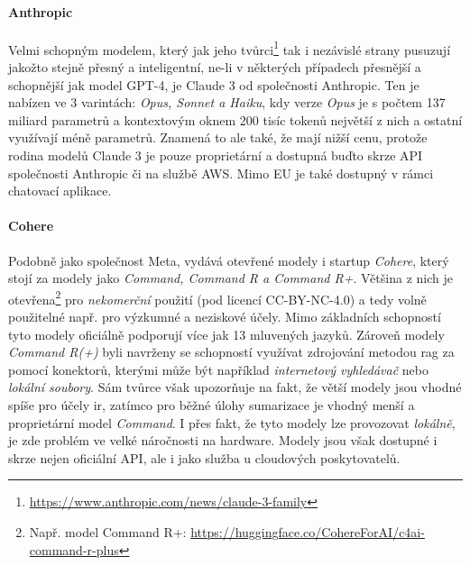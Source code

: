 \documentclass[czech, ma, kiv, he, iso690numb, pdf, viewonly]{fasthesis}
\begin{document}
    \paragraph{Anthropic} Velmi schopným modelem, který jak jeho tvůrci\footnote{\url{https://www.anthropic.com/news/claude-3-family}} tak i nezávislé strany pusuzují jakožto stejně přesný a inteligentní, ne-li v některých případech přesnější a schopnější jak model GPT-4, je Claude 3 od společnosti Anthropic. \cite{kevian2024capabilities} Ten je nabízen ve 3 varintách: \textit{Opus, Sonnet a Haiku}, kdy verze \textit{Opus} je s počtem 137 miliard parametrů a kontextovým oknem 200 tisíc tokenů největší z nich a ostatní využívají méně parametrů. Znamená to ale také, že mají nižší cenu, protože rodina modelů Claude 3 je pouze proprietární a dostupná buďto skrze API společnosti Anthropic či na službě AWS. Mimo EU je také dostupný v rámci chatovací aplikace. \cite{anthropic2023claude}

    \paragraph{Cohere} Podobně jako společnost Meta, vydává otevřené modely i startup \textit{Cohere}, který stojí za modely jako \textit{Command, Command R a Command R+}. Většina z nich je otevřena\footnote{Např. model Command R+: \url{https://huggingface.co/CohereForAI/c4ai-command-r-plus}} pro \emph{nekomerční} použití (pod licencí CC-BY-NC-4.0) a tedy volně použitelné např. pro výzkumné a neziskové účely. Mimo základních schopností tyto modely oficiálně podporují více jak 13 mluvených jazyků. Zároveň modely \textit{Command R(+)} byli navrženy se schopností využívat zdrojování metodou \Gls{rag} za pomocí konektorů, kterými může být například \textit{internetový vyhledávač} nebo \textit{lokální soubory}. Sám tvůrce však upozorňuje na fakt, že větší modely jsou vhodné spíše pro účely \Acrshort{ir}, zatímco pro běžné úlohy sumarizace je vhodný menší a proprietární model \textit{Command}. I přes fakt, že tyto modely lze provozovat \textit{lokálně}, je zde problém ve velké náročnosti na hardware. Modely jsou však dostupné i skrze nejen oficiální API, ale i jako služba u cloudových poskytovatelů. \cite{cohere_models} \cite{ruder_command_r}
\end{document}
